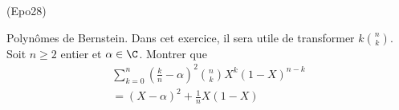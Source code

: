 \begin{tiny}(Epo28)\end{tiny} Polynômes de Bernstein.\newline
Dans cet exercice, il sera utile de transformer $k\binom{n}{k}$.\newline
Soit $n\geq 2$ entier et $\alpha\in \C$.\newline
Montrer que
\begin{multline*}
 \sum_{k=0}^n\left( \frac{k}{n}-\alpha \right)^2 \binom{n}{k}X^k(1-X)^{n-k} \\
= (X-\alpha)^2 + \frac{1}{n}X(1-X) 
\end{multline*}

 
